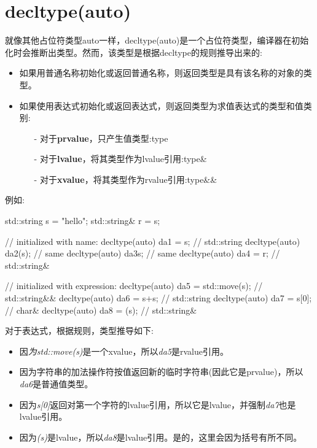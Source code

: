 \section{decltype(auto)}
就像其他占位符类型auto一样，decltype(auto)是一个占位符类型，编译器在初始化时会推断出类型。然而，该类型是根据decltype的规则推导出来的:

\begin{itemize}
	\item 如果用普通名称初始化或返回普通名称，则返回类型是具有该名称的对象的类型。
	\item 如果使用表达式初始化或返回表达式，则返回类型为求值表达式的类型和值类别:
	\begin{itemize}
		\item[-] 对于\textbf{prvalue}，只产生值类型:type
		\item[-] 对于\textbf{lvalue}，将其类型作为lvalue引用:type\&
		\item[-] 对于\textbf{xvalue}，将其类型作为rvalue引用:type\&\&
	\end{itemize}
\end{itemize}

例如:

\begin{cppcode}
std::string s = "hello";
std::string& r = s;

// initialized with name:
decltype(auto) da1 = s; // std::string
decltype(auto) da2(s); // same
decltype(auto) da3{s}; // same
decltype(auto) da4 = r; // std::string&

// initialized with expression:
decltype(auto) da5 = std::move(s); // std::string&&
decltype(auto) da6 = s+s; // std::string
decltype(auto) da7 = s[0]; // char&
decltype(auto) da8 = (s); // std::string&
\end{cppcode}

对于表达式，根据规则，类型推导如下:

\begin{itemize}
	\item 因\textit{为std::move(s)}是一个xvalue，所以\textit{da5}是rvalue引用。
	\item 因为字符串的加法操作符按值返回新的临时字符串(因此它是prvalue)，所以\textit{da6}是普通值类型。
	\item 因为\textit{s[0]}返回对第一个字符的lvalue引用，所以它是lvalue，并强制\textit{da7}也是lvalue引用。
	\item 因为\textit{(s)}是lvalue，所以\textit{da8}是lvalue引用。是的，这里会因为括号有所不同。
\end{itemize}

